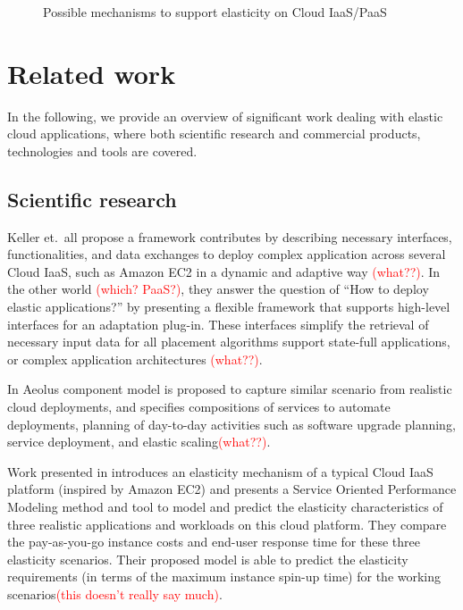 \documentclass{sig-alternate}
\newcommand\todo[1]{\textcolor{red}{(#1)}}
\begin{document}
\begin{figure*}
\centering
{}
\caption{Possible mechanisms to support elasticity on Cloud IaaS/PaaS ~\cite{vaquero2011dynamically}}
\label{fig:scalabilitymechanisms}
\end{figure*}

\section{Related work}
\label{sec:rw}
In the following, we provide an overview of significant work dealing with elastic cloud applications, where both scientific research and commercial products, technologies and tools are covered.

\subsection{Scientific research}
\label{sec:scientific}
Keller et.~all \cite{keller2013topology} propose a framework contributes by describing necessary interfaces, functionalities, and data exchanges to deploy complex application across several Cloud IaaS, such as Amazon EC2 in a dynamic and adaptive way \todo{what??}. In the other world \todo{which? PaaS?}, they answer the question of ``How to deploy elastic applications?'' by presenting a flexible framework that supports high-level interfaces for an adaptation plug-in. These interfaces simplify the retrieval of necessary input data for all placement algorithms support state-full applications, or complex application architectures \todo{what??}.

In \cite{di2012towards} Aeolus component model is proposed to capture similar scenario from realistic cloud deployments, and specifies compositions of services to automate deployments, planning of day-to-day activities such as software upgrade planning, service deployment, and elastic scaling\todo{what??}.

Work presented in \cite{brebner2012your} introduces an elasticity mechanism of a typical Cloud IaaS platform (inspired by Amazon EC2) and presents a Service Oriented Performance Modeling method and tool to model and predict the elasticity characteristics of three realistic applications and workloads on this cloud platform. They compare the pay-as-you-go instance costs and end-user response time for these three elasticity scenarios. Their proposed model is able to predict the elasticity requirements (in terms of the maximum instance spin-up time) for the working scenarios\todo{this doesn't really say much}.
\end{document}
